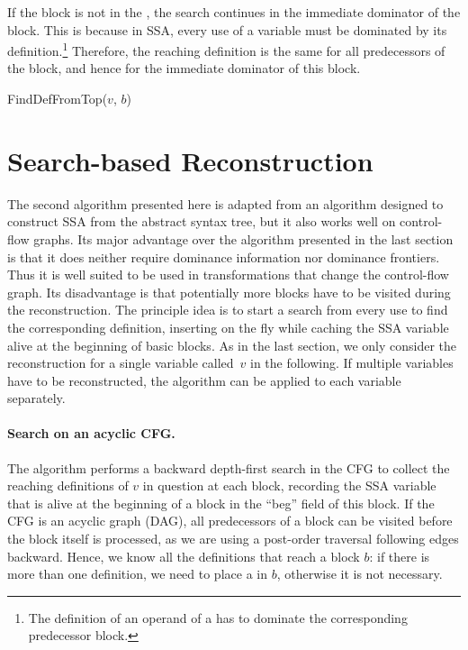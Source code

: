 {If the block is not in the \iDF, the search continues in the immediate dominator of the block.
This is because in SSA, every use of a variable must be dominated by its definition.\footnote{The definition of an operand of a \phifun has to dominate the corresponding predecessor block.}
Therefore, the reaching definition is the same for all predecessors of the block, and hence for the immediate dominator of this block.

\begin{procedure}
  \caption{FindDefFromTop($v$, $b$)}
  \label{proc:def-from-end-ssaconstr}
\end{procedure}

\section{Search-based Reconstruction}


The second algorithm presented here is adapted from an algorithm designed to construct SSA from the abstract syntax tree, but it also works well on control-flow graphs.
Its major advantage over the algorithm presented in the last section is that it does neither require dominance information nor dominance frontiers.
Thus it is well suited to be used in transformations that change the control-flow graph.
Its disadvantage is that potentially more blocks have to be visited during the reconstruction.
The principle idea is to start a search from every use to find the corresponding definition, inserting \phifuns on the fly while caching the SSA variable alive at the beginning of basic blocks.
As in the last section, we only consider the reconstruction for a single variable called~$v$ in the following.
If multiple variables have to be reconstructed, the algorithm can be applied to each variable separately.

\paragraph{Search on an acyclic CFG.}
The algorithm performs a backward depth-first search in the CFG to collect the reaching definitions of $v$ in question at each block,
recording the SSA variable that is alive at the beginning of a block in the ``beg'' field of this block.
If the CFG is an acyclic graph (DAG), all predecessors of a block can be visited before the block itself is processed, as we are using a post-order traversal following edges backward.
Hence, we know all the definitions that reach a block $b$: if there is more than one definition, we need to place a \phifun in $b$, otherwise it is not necessary.

}
